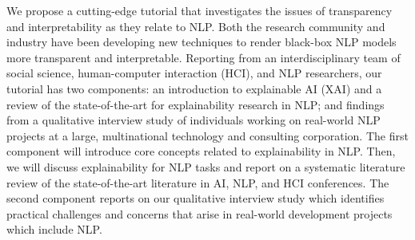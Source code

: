 We propose a cutting-edge tutorial that investigates the issues of transparency and interpretability as they relate to NLP. Both the research community and industry have been developing new techniques to render black-box NLP models more transparent and interpretable. Reporting from an interdisciplinary team of social science, human-computer interaction (HCI), and NLP researchers, our tutorial has two components: an introduction to explainable AI (XAI) and a review of the state-of-the-art for explainability research in NLP; and findings from a qualitative interview study of individuals working on real-world NLP projects at a large, multinational technology and consulting corporation. The first component will introduce core concepts related to explainability in NLP. Then, we will discuss explainability for NLP tasks and report on a systematic literature review of the state-of-the-art literature in AI, NLP, and HCI conferences. The second component reports on our qualitative interview study which identifies practical challenges and concerns that arise in real-world development projects which include NLP.
